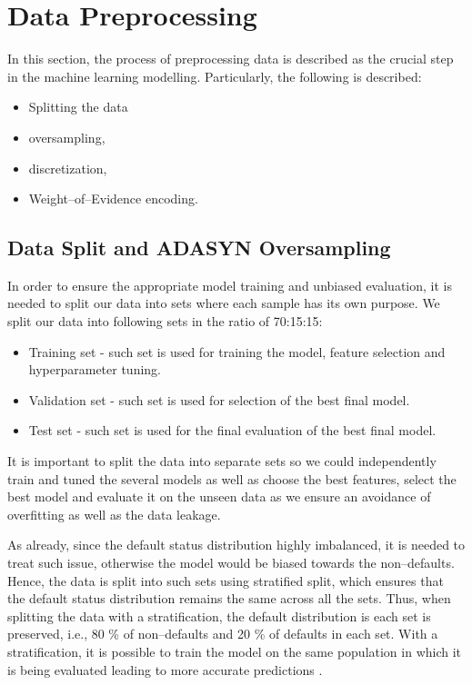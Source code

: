 \section{Data Preprocessing}
In this section, the process of preprocessing data is described as the crucial step in the machine learning modelling. Particularly, the following is described:
\begin{itemize}\setlength\itemsep{0em}
    \item Splitting the data
    \item oversampling,
    \item discretization,
    \item Weight--of--Evidence encoding.
\end{itemize}


\subsection{Data Split and ADASYN Oversampling}
\label{subsec:data-split-ADASYN}

In order to ensure the appropriate model training and unbiased evaluation, it is needed to split our data into sets where each sample has its own purpose. We split our data into following sets in the ratio of 70:15:15:
\begin{itemize}\setlength\itemsep{0em}
    \item Training set - such set is used for training the model, feature selection and hyperparameter tuning.
    \item Validation set - such set is used for selection of the best final model.
    \item Test set - such set is used for the final evaluation of the best final model.
\end{itemize}

It is important to split the data into separate sets so we could independently train and tuned the several models as well as choose the best features, select the best model and evaluate it on the unseen data as we ensure an avoidance of overfitting as well as the data leakage.

As already, since the default status distribution highly imbalanced, it is needed to treat such issue, otherwise the model would be biased towards the non--defaults.
Hence, the data is split into such sets using stratified split, which ensures that the default status distribution remains the same across all the sets.
Thus, when splitting the data with a stratification, the default distribution is each set is preserved, i.e., 80 \% of non--defaults and 20 \% of defaults in each set.
With a stratification, it is possible to train the model on the same population in which it is being evaluated leading to more accurate predictions \citep{igareta2021strat}.

